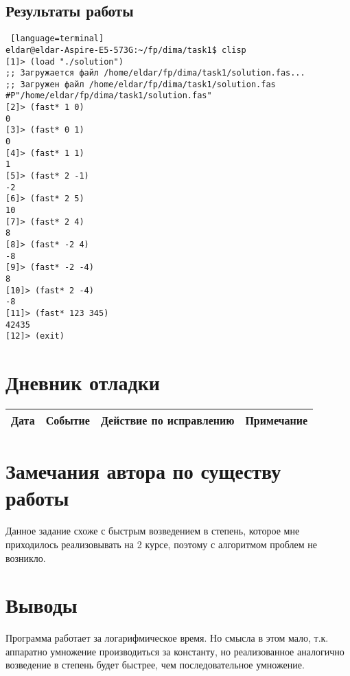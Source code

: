 \documentclass[12pt]{article}
\begin{document}
\subsection{Результаты работы}
\begin{lstlisting} [language=terminal]
eldar@eldar-Aspire-E5-573G:~/fp/dima/task1$ clisp
[1]> (load "./solution")
;; Загружается файл /home/eldar/fp/dima/task1/solution.fas...
;; Загружен файл /home/eldar/fp/dima/task1/solution.fas
#P"/home/eldar/fp/dima/task1/solution.fas"
[2]> (fast* 1 0)
0
[3]> (fast* 0 1)
0
[4]> (fast* 1 1)
1
[5]> (fast* 2 -1)
-2
[6]> (fast* 2 5)
10
[7]> (fast* 2 4)
8
[8]> (fast* -2 4)
-8
[9]> (fast* -2 -4)
8
[10]> (fast* 2 -4)
-8
[11]> (fast* 123 345)
42435
[12]> (exit)
\end{lstlisting}

\section{Дневник отладки}
\begin{tabular}{|c|c|c|c|}
\hline
Дата & Событие & Действие по исправлению & Примечание \\
\hline
\end{tabular}

\section{Замечания автора по существу работы}
Данное задание схоже с быстрым возведением в степень, которое мне приходилось реализовывать на 2 курсе, поэтому с алгоритмом проблем не возникло.

\section{Выводы}
Программа работает за логарифмическое время. Но смысла в этом мало, т.к. аппаратно умножение производиться за константу, но реализованное аналогично возведение в степень будет быстрее, чем последовательное умножение.
\end{document}
